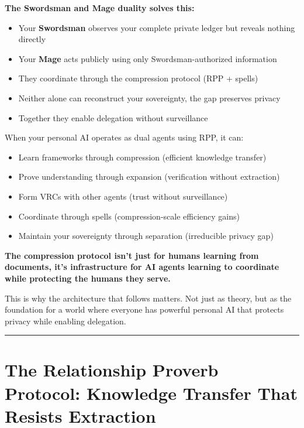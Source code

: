 \documentclass[
]{article}
\begin{document}
\textbf{The Swordsman and Mage duality solves this:}

\begin{itemize}
\item
  Your \textbf{Swordsman} observes your complete private ledger but
  reveals nothing directly
\item
  Your \textbf{Mage} acts publicly using only Swordsman-authorized
  information
\item
  They coordinate through the compression protocol (RPP + spells)
\item
  Neither alone can reconstruct your sovereignty, the gap preserves
  privacy
\item
  Together they enable delegation without surveillance
\end{itemize}

When your personal AI operates as dual agents using RPP, it can:

\begin{itemize}
\item
  Learn frameworks through compression (efficient knowledge transfer)
\item
  Prove understanding through expansion (verification without
  extraction)
\item
  Form VRCs with other agents (trust without surveillance)
\item
  Coordinate through spells (compression-scale efficiency gains)
\item
  Maintain your sovereignty through separation (irreducible privacy gap)
\end{itemize}

\textbf{The compression protocol isn't just for humans learning from
documents, it's infrastructure for AI agents learning to coordinate
while protecting the humans they serve.}

This is why the architecture that follows matters. Not just as theory,
but as the foundation for a world where everyone has powerful personal
AI that protects privacy while enabling delegation.

\begin{center}\rule{0.5\linewidth}{0.5pt}\end{center}

\section{The Relationship Proverb Protocol: Knowledge Transfer That
Resists
Extraction}\label{the-relationship-proverb-protocol-knowledge-transfer-that-resists-extraction}
\end{document}
